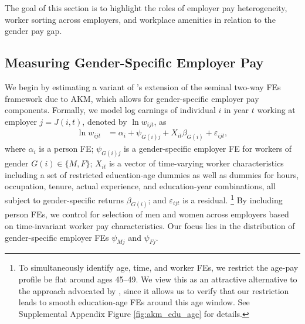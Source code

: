 

\section{{\sectionthree}\label{sec:Empirical-Gender-Gaps}}

The goal of this section is to highlight the roles of employer pay heterogeneity, worker sorting across employers, and workplace amenities in relation to the gender pay gap.


\subsection{Measuring Gender-Specific Employer Pay\label{subsec:emp_het}}

We begin by estimating a variant of \citeauthor{CardCardosoKline2016}'s \citeyearpar{CardCardosoKline2016} extension of the seminal two-way FEs framework due to AKM, which allows for gender-specific employer pay components. Formally, we model log earnings of individual $i$ in year $t$ working at employer $j = J(i,t)$, denoted by $\ln w_{ijt}$, as
%
\begin{align}
  \ln w_{ijt} &= \alpha_{i} + \psi_{G(i)j} + X_{it}\beta_{G(i)} + \varepsilon_{ijt}, \label{eq:akm}
\end{align}
%
where $\alpha_{i}$ is a person FE; %
%
$\psi_{G(i)j}$ is a gender-specific employer FE for workers of gender $G(i) \in \{ M, F \}$; %
%
$X_{it}$ is a vector of time-varying worker characteristics including a set of restricted education-age dummies as well as dummies for hours, occupation, tenure, actual experience, and education-year combinations, all subject to gender-specific returns $\beta_{G(i)}$; %
%
and $\varepsilon_{ijt}$ is a residual.%
%
\footnote{To simultaneously identify age, time, and worker FEs, we restrict the age-pay profile be flat around ages 45--49. We view this as an attractive alternative to the approach advocated by \citet{CardCardosoHeiningKline2018}, since it allows us to verify that our restriction leads to smooth education-age FEs around this age window. See Supplemental Appendix Figure \ref{fig:akm_edu_age} for details.} %
%
By including person FEs, we control for selection of men and women across employers based on time-invariant worker pay characteristics. Our focus lies in the distribution of gender-specific employer FEs $\psi_{Mj}$ and $\psi_{Fj}$.


